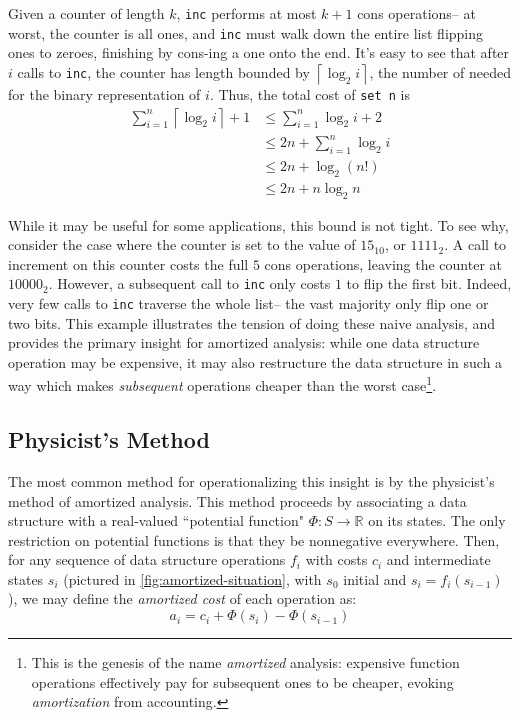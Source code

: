 Given a counter of length $k$, \texttt{inc} performs at most $k + 1$ cons operations-- at worst, the counter is all ones, and \texttt{inc} must walk down the entire list flipping ones to zeroes, finishing by cons-ing a one onto the end. It's easy to see that after $i$ calls to \texttt{inc}, the counter has length bounded by $\left \lceil{\log_2 i}\right \rceil$, the number of needed for the binary representation of $i$. Thus, the total cost of \texttt{set n} is
\begin{align*}
  \sum_{i=1}^n \left\lceil{\log_2 i}\right \rceil + 1
  &\leq \sum_{i=1}^n \log_2 i + 2\\
  &\leq 2n + \sum_{i=1}^n \log_2 i\\
  &\leq 2n + \log_2(n!)\\
  &\leq 2n + n\log_2 n
\end{align*}

While it may be useful for some applications, this bound is not tight. To see why, consider the case where the counter is set to the value of $15_{10}$, or $1111_2$. A  call to increment on this counter costs the full $5$ cons operations, leaving the counter at $10000_2$. However, a subsequent call to \texttt{inc} only costs $1$ to flip the first bit. Indeed, very few calls to \texttt{inc} traverse the whole list-- the vast majority only flip one or two bits. This example illustrates the tension of doing these naive analysis, and provides the primary insight for amortized analysis: while one data structure operation may be expensive, it may also restructure the data structure in such a way which makes \textit{subsequent} operations cheaper than the worst case\footnote{
This is the genesis of the name \textit{amortized} analysis: expensive function operations effectively pay for subsequent ones to be cheaper, evoking \textit{amortization} from accounting.
}.

\subsection{Physicist's Method}
The most common method for operationalizing this insight is by the physicist's method of amortized analysis. This method proceeds by associating a data structure with a real-valued ``potential function" $\Phi : S \to \mathbb{R}$ on its states. The only restriction on potential functions is that they be nonnegative everywhere.
Then, for any sequence of data structure operations $f_i$ with costs $c_i$ and intermediate states $s_i$ (pictured in \autoref{fig:amortized-situation}, with $s_0$ initial and $s_i = f_i(s_{i-1})$), we may define the \textit{amortized cost} of each operation as:
$$
a_i = c_i + \Phi(s_i) - \Phi(s_{i-1})
$$

